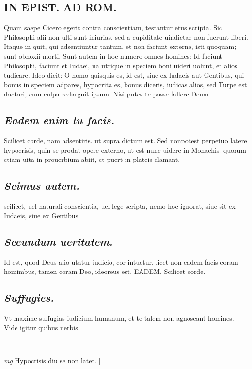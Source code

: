 \documentclass{article}
\begin{document}
\begin{pages}
\section*{ IN EPIST. AD ROM.  }
\marginpar{[ p.]}\pstart Quam saepe Cicero egerit contra conscientiam, testantur etus scripta. Sic Philosophi alii non ulti sunt iniurias, sed a cupiditate uindictae non fuerunt liberi. Itaque in quit, qui adsentiuntur tantum, et non faciunt externe, isti quoquam; sunt obnoxii morti. Sunt autem in hoc numero omnes homines: Id faciunt Philosophi, faciunt et Iudaei, na utrique in speciem boni uideri uolunt, et alios tudicare. Ideo dicit: O homo quisquis es, id est, siue ex ludaeis aut Gentibus, qui bonus in speciem adpares, hypocrita es, bonus diceris, iudicas alios, sed Turpe est doctori, cum culpa redarguit ipsum. Nisi putes te posse fallere Deum.   \pend
{}
{}
\subsection*{\textit{Eadem enim tu facis. }}\pstart Scilicet corde, nam adsentiris, ut supra dictum est. Sed nonpotest perpetuo latere hypocrisis, quin se prodat opere externo, ut est nunc uidere in Monachis, quorum etiam uita in prouerbium abiit, et puert in plateis clamant.   \pend
{}
{}
\subsection*{\textit{Scimus autem. }}\pstart scilicet, uel naturali conscientia, uel lege scripta, nemo hoc ignorat, siue sit ex Iudaeis, siue ex Gentibus.   \pend
{}
{}
\subsection*{\textit{Secundum ueritatem. }}\pstart Id est, quod Deus alio utatur iudicio, cor intuetur, licet non eadem facis coram homimbus, tamen coram Deo, ideoreus est. EADEM. Scilicet corde.   \pend
{}
{}
\subsection*{\textit{Suffugies. }}\pstart Vt maxime suffugias iudicium humanum, et te talem non agnoscant homines. Vide igitur quibus uerbis  \pend
\vspace{0.5cm}\noindent
\vspace{0.2cm}\rule{1cm}{0.2pt}\\ 
\hspace{0.2cm}\textit{mg}
\footnotesize Hypocrisis diu se non latet. 
\normalsize| 

\end{pages}
\end{document}
